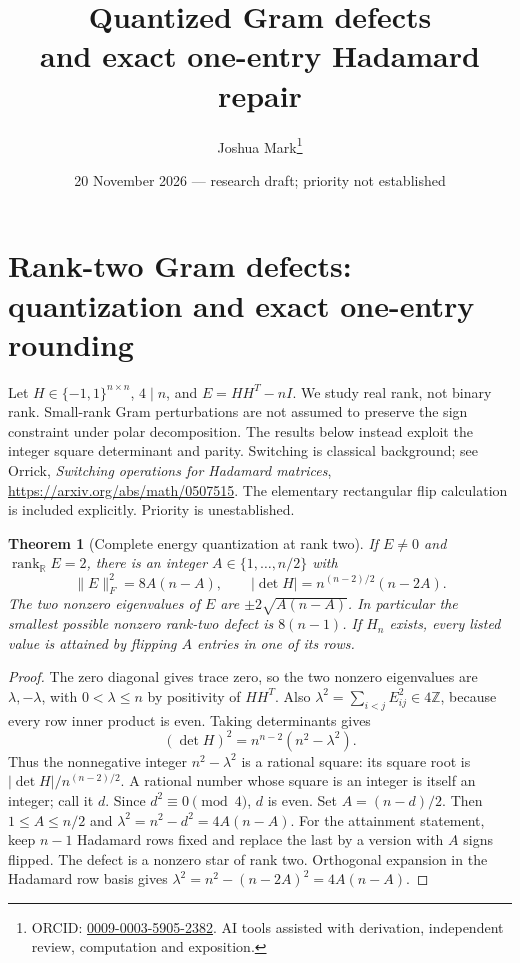 \documentclass[11pt]{article}
\title{Quantized Gram defects\\and exact one-entry Hadamard repair}
\author{Joshua Mark\thanks{ORCID: \href{https://orcid.org/0009-0003-5905-2382}{0009-0003-5905-2382}. AI tools assisted with derivation, independent review, computation and exposition.}}
\date{20 November 2026 --- research draft; priority not established}
\newtheorem{theorem}{Theorem}[section]
\begin{document}
\maketitle
\section{Rank-two Gram defects: quantization and exact one-entry rounding}
\label{sec:spectral-rank-two}
Let $H\in\{-1,1\}^{n\times n}$, $4\mid n$, and
$E=HH^T-nI$. We study real rank, not binary rank. Small-rank Gram
perturbations are not assumed to preserve the sign constraint under
polar decomposition. The results below instead exploit the integer
square determinant and parity. Switching is classical background; see
Orrick, \emph{Switching operations for Hadamard matrices},
\url{https://arxiv.org/abs/math/0507515}. The elementary rectangular
flip calculation is included explicitly. Priority is unestablished.

\begin{theorem}[Complete energy quantization at rank two]
\label{thm:spectral-quantization}
If $E\ne0$ and $\operatorname{rank}_{\mathbb R}E=2$, there is an integer
$A\in\{1,\ldots,n/2\}$ with
\[
 \|E\|_F^2=8A(n-A),\qquad
 |\det H|=n^{(n-2)/2}(n-2A).
\]
The two nonzero eigenvalues of $E$ are
$\pm2\sqrt{A(n-A)}$. In particular the smallest possible nonzero
rank-two defect is $8(n-1)$. If $H_n$ exists, every listed value is
attained by flipping $A$ entries in one of its rows.
\end{theorem}
\begin{proof}
The zero diagonal gives trace zero, so the two nonzero eigenvalues are
$\lambda,-\lambda$, with $0<\lambda\le n$ by positivity of $HH^T$.
Also $\lambda^2=\sum_{i<j}E_{ij}^2\in4\mathbb Z$, because every
row inner product is even. Taking determinants gives
\[
 (\det H)^2=n^{n-2}(n^2-\lambda^2).
\]
Thus the nonnegative integer $n^2-\lambda^2$ is a rational square:
its square root is $|\det H|/n^{(n-2)/2}$. A rational number whose
square is an integer is itself an integer; call it $d$. Since
$d^2\equiv0\pmod4$, $d$ is even. Set $A=(n-d)/2$.
Then $1\le A\le n/2$ and $\lambda^2=n^2-d^2=4A(n-A)$.
For the attainment statement, keep $n-1$ Hadamard rows fixed and replace
the last by a version with $A$ signs flipped. The defect is a nonzero
star of rank two. Orthogonal expansion in the Hadamard row basis gives
$\lambda^2=n^2-(n-2A)^2=4A(n-A)$.
\end{proof}
\end{document}
